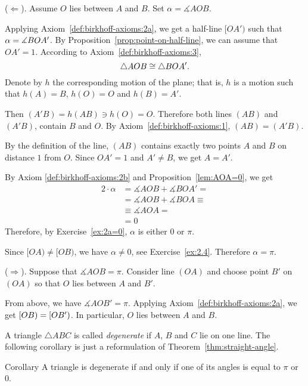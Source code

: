 \parit{}($\Leftarrow$).
Assume $O$  
lies between $A$ and $B$.
Set  $\alpha=\measuredangle A O B$.

Applying Axiom~\ref{def:birkhoff-axioms:2a},
we get a half-line $[OA')$ such that $\alpha\z=\measuredangle B O A'$.
By Proposition~\ref{prop:point-on-half-line}, we can assume that $OA'=1$.
According to Axiom~\ref{def:birkhoff-axioms:3},
\[\triangle AOB\z\cong\triangle BOA'.\]
Denote by $h$ the corresponding motion of the plane;
that is, $h$ is a motion such that $h(A)=B$, $h(O)=O$ and $h(B)=A'$. 

Then $(A'B)=h(AB)\ni h(O)=O$.
Therefore both lines $(AB)$ and $(A'B)$, 
 contain $B$ and $O$.
By Axiom~\ref{def:birkhoff-axioms:1}, $(AB)=(A'B)$.

By the definition of the line,
$(AB)$ contains exactly two points $A$ and $B$ on distance $1$ from $O$.
Since $OA'=1$ and $A'\ne B$, we get $A=A'$.

By Axiom \ref{def:birkhoff-axioms:2b} and Proposition~\ref{lem:AOA=0}, we get
\begin{align*}
2\cdot\alpha&=
\measuredangle AOB+\measuredangle BOA'=
\\
&=\measuredangle AOB+\measuredangle BOA\equiv
\\
&\equiv\measuredangle AOA=
\\
&= 0
\end{align*}
Therefore, by Exercise~\ref{ex:2a=0}, $\alpha$ is either $0$ or $\pi$.

Since $[OA)\ne [OB)$,  
we have $\alpha\ne 0$, see Exercise~\ref{ex:2.4}.
Therefore $\alpha=\pi$.


\parit{}($\Rightarrow$).
Suppose that $\measuredangle A O B= \pi$.
Consider line $(OA)$ and choose point $B'$ on $(OA)$ so that $O$ lies between $A$ and $B'$.

From above, we have $\measuredangle AOB'=\pi$.
Applying Axiom~\ref{def:birkhoff-axioms:2a}, 
we get $[O B)\z=[O B')$.
In particular, $O$ lies between $A$ and $B$.
\qeds 

A triangle $\triangle ABC$ is called 
\emph{degenerate}
if $A$, $B$ and $C$ lie on one line.
The following corollary is just a reformulation of Theorem~\ref{thm:straight-angle}.

\begin{thm}{Corollary}\label{cor:degenerate=pi}
A triangle is degenerate if and only if one of its angles is equal to $\pi$ or $0$.
\end{thm}

